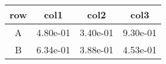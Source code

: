 \begin{tabular}{cccc}
\toprule
row&col1&col2&col3\tabularnewline
\midrule
A&4.80e-01&3.40e-01&9.30e-01\tabularnewline
B&6.34e-01&3.88e-01&4.53e-01\tabularnewline
\bottomrule
\end{tabular}
